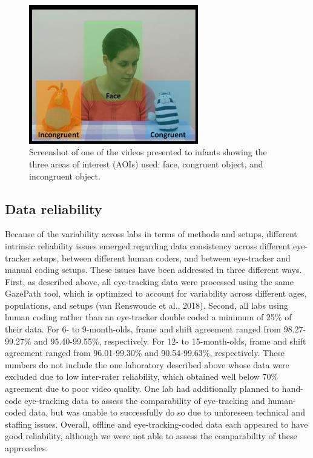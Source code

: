 \documentclass[
  english,
  ,man,floatsintext]{apa6}
\begin{document}
\begin{figure}

{\centering \includegraphics[width=2.91in]{Figure1} 

}

\caption{Screenshot of one of the videos presented to infants showing the three areas of interest (AOIs) used: face, congruent object, and incongruent object.}\label{fig:fig1}
\end{figure}

\hypertarget{data-reliability}{%
\subsection{Data reliability}\label{data-reliability}}

Because of the variability across labs in terms of methods and setups, different intrinsic reliability issues emerged regarding data consistency across different eye-tracker setups, between different human coders, and between eye-tracker and manual coding setups. These issues have been addressed in three different ways. First, as described above, all eye-tracking data were processed using the same GazePath tool, which is optimized to account for variability across different ages, populations, and setups (van Renswoude et al., 2018). Second, all labs using human coding rather than an eye-tracker double coded a minimum of 25\% of their data. For 6- to 9-month-olds, frame and shift agreement ranged from 98.27-99.27\% and 95.40-99.55\%, respectively. For 12- to 15-month-olds, frame and shift agreement ranged from 96.01-99.30\% and 90.54-99.63\%, respectively. These numbers do not include the one laboratory described above whose data were excluded due to low inter-rater reliability, which obtained well below 70\% agreement due to poor video quality. One lab had additionally planned to hand-code eye-tracking data to assess the comparability of eye-tracking and human-coded data, but was unable to successfully do so due to unforeseen technical and staffing issues. Overall, offline and eye-tracking-coded data each appeared to have good reliability, although we were not able to assess the comparability of these approaches.
\end{document}
